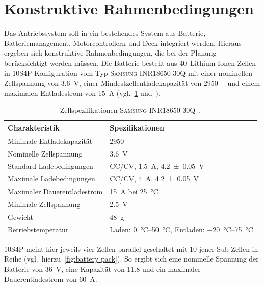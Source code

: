 	\section{Konstruktive Rahmenbedingungen}
		Das Antriebssystem soll in ein bestehendes System aus Batterie, Batteriemanagement, Motorcontrollern und Deck integriert werden.
		Hieraus ergeben sich konstruktive Rahmenbedingungen, die bei der Planung berücksichtigt werden müssen.
		Die Batterie besteht aus 40~Lithium-Ionen Zellen in 10S4P-Konfiguration vom Typ \textsc{Samsung INR18650-30Q} mit einer nominellen Zellspannung von \qty{3,6}{\volt}, einer Mindestzellentladekapazität von \qty{2950}{\milli\amperehour} und einem maximalen Entladestrom von \qty{15}{\ampere} (vgl.~\cref{tab:cellspecifications} und~\cite{INR18650.30Q.Specs.202202}).
		\begin{table}[h]
			\caption[Zellspezifikationen \textsc{Samsung INR18650-30Q}]{Zellspezifikationen \textsc{Samsung INR18650-30Q}~\cite{INR18650.30Q.Specs.202202}.}
			\label{tab:cellspecifications}
			\centering
			\begin{tabular}{@{}ll@{}}
				\toprule
				Charakteristik				& Spezifikationen \\ \midrule
				Minimale Entladekapazität	& \qty{2950}{\milli\amperehour} \\
				Nominelle Zellspannung		& \qty{3,6}{\volt} \\
				Standard Ladebedingungen	& CC/CV, \qty{1,5}{\ampere}, \qty{4,2 +- 0,05}{\volt} \\
				Maximale Ladebedingungen	& CC/CV, \qty{4}{\ampere}, \qty{4,2 +- 0,05}{\volt} \\
				Maximaler Dauerentladestrom & \qty{15}{\ampere} bei \qty{25}{\degreeCelsius} \\
				Minimale Zellspannung		& \qty{2,5}{\volt} \\
				Gewicht						& \qty{48}{\gram} \\
				Betriebstemperatur			& Laden: \qtyrange{0}{50}{\degreeCelsius}, Entladen: \qtyrange{-20}{75}{\degreeCelsius} \\ \bottomrule
			\end{tabular}
		\end{table}
		10S4P meint hier jeweils vier Zellen parallel geschaltet mit 10 jener Sub-Zellen in Reihe (vgl.~hierzu~\cref{fig:battery pack}).
		So ergibt sich eine nominelle Spannung der Batterie von \qty{36}{\volt}, eine Kapazität von \qty{11,8}{\amperehour} und ein maximaler Dauerentladestrom von \SI{60}{\ampere}.
